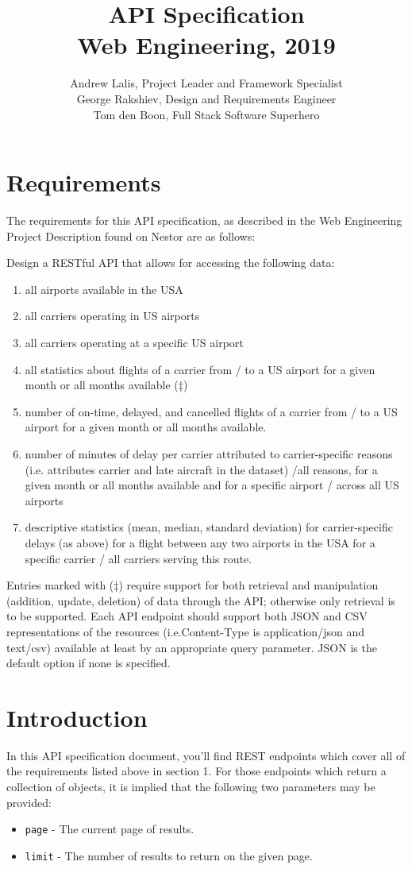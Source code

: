 \documentclass{article}
\title{API Specification \\ \small{Web Engineering, 2019}}
\author{Andrew Lalis, Project Leader and Framework Specialist \\ 
George Rakshiev, Design and Requirements Engineer \\ 
Tom den Boon, Full Stack Software Superhero}
\begin{document}
\maketitle

\section{Requirements}
	The requirements for this API specification, as described in the Web Engineering Project Description found on Nestor are as follows:
	
	\noindent Design a RESTful API that allows for accessing the following data:
	
	\begin{enumerate}
		\item all airports available in the USA
		\item all carriers operating in US airports
		\item all carriers operating at a specific US airport
		\item all statistics about flights of a carrier from / to a US airport for a given month or all months available (‡)
		\item number of on-time, delayed, and cancelled flights of a carrier from / to a US airport for a given month or all months available.
		\item  number of minutes of delay per carrier attributed to carrier-specific reasons (i.e.  attributes carrier and late aircraft in  the  dataset) /all  reasons,  for  a given month or all months available and for a specific airport / across all US airports
		\item descriptive statistics (mean, median, standard deviation) for carrier-specific delays (as above) for a flight between any two airports in the USA for a specific carrier / all carriers serving this route.
	\end{enumerate}
	
	Entries marked with (‡) require support for both retrieval and manipulation  (addition,  update,  deletion)  of  data  through  the  API;  otherwise  only retrieval  is  to  be  supported.   Each  API  endpoint  should  support  both  JSON and CSV representations of the resources (i.e.Content-Type is application/json and text/csv) available at least by an appropriate query parameter.  JSON is the default option if none is specified.

\section{Introduction}
	In this API specification document, you'll find REST endpoints which cover all of the requirements listed above in section 1. For those endpoints which return a collection of objects, it is implied that the following two parameters may be provided:
	\begin{itemize}
		\item \texttt{page} - The current page of results.
		\item \texttt{limit} - The number of results to return on the given page.
	\end{itemize}
	
\end{document}
